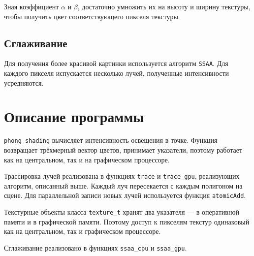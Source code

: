 Зная коэффициент $\alpha$ и $\beta$, достаточно умножить их на высоту и ширину текстуры, чтобы получить цвет соответствующего пикселя текстуры.

\subsection{Сглаживание}
Для получения более красивой картинки используется алгоритм \texttt{SSAA}. Для каждого пикселя испускается несколько лучей, полученные интенсивности усредняются.
\pagebreak

\section{Описание программы}
\texttt{phong\_shading} вычисляет интенсивность освещения в точке. Функция возвращает трёхмерный вектор цветов, принимает указатели, поэтому работает как на центральном, так и на графическом процессоре.

Трассировка лучей реализована в функциях \texttt{trace} и \texttt{trace\_gpu}, реализующих алгоритм, описанный выше. Каждый луч пересекается с каждым полигоном на сцене. Для параллельной записи новых лучей используется функция \texttt{atomicAdd}.

Текстурные объекты класса \texttt{texture\_t} хранят два указателя --- в оперативной памяти и в графической памяти. Поэтому доступ к пикселям текстур одинаковый как на центральном, так и графическом процессоре.

Сглаживание реализовано в функциях \texttt{ssaa\_cpu} и \texttt{ssaa\_gpu}.

